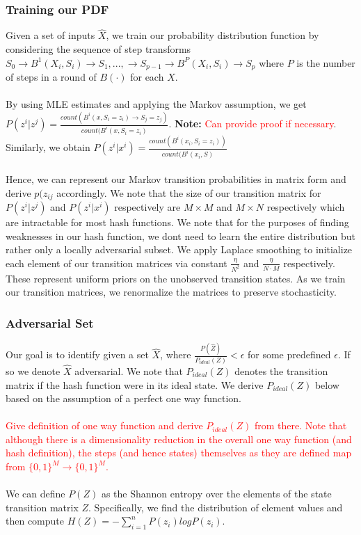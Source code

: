 \subsubsection{Training our PDF}
\label{MarkovProcess}
Given a set of inputs $\hat{X}$, we train our probability distribution function by considering the sequence of step transforms $S_{0} \rightarrow B^{1}(X_{i}, S_{i}) \rightarrow S_{1},..., \rightarrow S_{p-1} \rightarrow B^{P}(X_{i}, S_{i}) \rightarrow S_{p}$ where $P$ is the number of steps in a round of $B(\cdot)$ for each $X$. 
\\
\\
By using MLE estimates and applying the Markov assumption, we get $P(z^{i} | z^{j}) = \frac{count(B^{i}(x, S_{i} = z_{i}) \rightarrow S_{j} = z_{j})}{count(B^{i}(x, S_{i} = z_{i})}$. \textbf{Note:} \textcolor{red}{Can provide proof if necessary}. Similarly, we obtain $P(z^{i} | x^{i}) = \frac{count(B^{i}(x_{i}, S_{i} = z_{i}))}{count(B^{i}(x_{i}, S)}$
\\
\\
Hence, we can represent our Markov transition probabilities in matrix form and derive $p(z_{ij}$ accordingly. We note that the size of our transition matrix for $P(z^{i} | z^{j})$ and $P(z^{i} | x^{i})$ respectively are $M \times M$ and $M \times N$ respectively which are intractable for most hash functions. We note that for the purposes of finding weaknesses in our hash function, we dont need to learn the entire distribution but rather only a locally adversarial subset. We apply Laplace smoothing to initialize each element of our transition matrices via constant $\frac{\eta}{N^{2}}$ and $\frac{\eta}{N \cdot M}$ respectively. These represent uniform priors on the unobserved transition states. As we train our transition matrices, we renormalize the matrices to preserve stochasticity.

\subsubsection{Adversarial Set}
Our goal is to identify given a set $\hat{X}$, where $\frac{P(\hat{Z})}{P_{ideal}(Z)} < \epsilon$ for some predefined $\epsilon$. If so we denote $\hat{X}$ adversarial. We note that $P_{ideal}(Z)$ denotes the transition matrix if the hash function were in its ideal state. We derive $P_{ideal}(Z)$ below based on the assumption of a perfect one way function.
\\
\\
\textcolor{red}{Give definition of one way function and derive $P_{ideal}(Z)$ from there. Note that although there is a dimensionality reduction in the overall one way function (and hash definition), the steps (and hence states) themselves as they are defined map from $\{0,1\}^{M} \rightarrow \{0,1\}^{M}$.} 
\\
\\
We can define $P(Z)$ as the Shannon entropy over the elements of the state transition matrix $Z$. Specifically, we find the distribution of element values and then compute $H(Z) = -\sum_{i=1}^{n} P(z_{i}) log P(z_{i})$.

